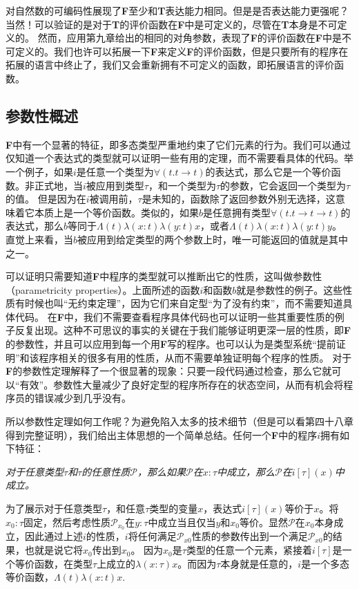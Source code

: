 对自然数的可编码性展现了\textbf{F}至少和\textbf{T}表达能力相同。但是是否表达能力更强呢？当然！可以验证的是对于\textbf{T}的评价函数在\textbf{F}中是可定义的，尽管在\textbf{T}本身是不可定义的。
然而，应用第九章给出的相同的对角参数，表现了\textbf{F}的评价函数在\textbf{F}中是不可定义的。我们也许可以拓展一下\textbf{F}来定义\textbf{F}的评价函数，但是只要所有的程序在拓展的语言中终止了，我们又会重新拥有不可定义的函数，即拓展语言的评价函数。

\subsection{参数性概述}
\textbf{F}中有一个显著的特征，即多态类型严重地约束了它们元素的行为。我们可以通过仅知道一个表达式的类型就可以证明一些有用的定理，而不需要看具体的代码。举一个例子，如果$i$是任意一个类型为$\forall (t.t\to t)$的表达式，那么它是一个等价函数。非正式地，当$i$被应用到类型$\tau$，和一个类型为$\tau$的参数，它会返回一个类型为$\tau$的值。
但是因为在$i$被调用前，$\tau$是未知的，函数除了返回参数外别无选择，这意味着它本质上是一个等价函数。类似的，如果$b$是任意拥有类型$\forall (t.t \to t \to t)$的表达式，那么$b$等同于$\Lambda (t) \lambda (x:t) \lambda (y:t) x$，或者$\Lambda (t) \lambda (x:t) \lambda (y:t) y$。
直觉上来看，当$b$被应用到给定类型的两个参数上时，唯一可能返回的值就是其中之一。

可以证明只需要知道\textbf{F}中程序的类型就可以推断出它的性质，这叫做参数性（parametricity properties）。上面所述的函数$i$和函数$b$就是参数性的例子。这些性质有时候也叫“无约束定理”，因为它们来自定型“为了没有约束”，而不需要知道具体代码。
在\textbf{F}中，我们不需要查看程序具体代码也可以证明一些其重要性质的例子反复出现。这种不可思议的事实的关键在于我们能够证明更深一层的性质，即\textbf{F}的参数性，并且可以应用到每一个用\textbf{F}写的程序。也可以认为是类型系统“提前证明”和该程序相关的很多有用的性质，从而不需要单独证明每个程序的性质。
对于\textbf{F}的参数性定理解释了一个很显著的现象：只要一段代码通过检查，那么它就可以“有效”。参数性大量减少了良好定型的程序所存在的状态空间，从而有机会将程序员的错误减少到几乎没有。

所以参数性定理如何工作呢？为避免陷入太多的技术细节（但是可以看第四十八章得到完整证明），我们给出主体思想的一个简单总结。任何一个\textbf{F}中的程序$i$拥有如下特征：
\begin{center}
  \textit{对于任意类型$\tau$和$\tau$的任意性质$\mathcal{P}$，那么如果$\mathcal{P}$在$x:\tau$中成立，那么$\mathcal{P}$在$i[\tau](x)$中成立。}
\end{center}

为了展示对于任意类型$\tau$，和任意$\tau$类型的变量$x$，表达式$i[\tau ](x)$等价于$x$。将$x_0: \tau$固定，然后考虑性质$\mathcal{P}_{x_0}$在$y:\tau$中成立当且仅当$y$和$x_0$等价。显然$\mathcal{P}$在$x_0$本身成立，因此通过上述$i$的性质，$i$将任何满足$\mathcal{P}_{x0}$性质的参数传出到一个满足$\mathcal{P}_{x0}$的结果，也就是说它将$x_0$传出到$x_0$。
因为$x_0$是$\tau$类型的任意一个元素，紧接着$i[\tau]$是一个等价函数，在类型$\tau$上成立的$\lambda(x:\tau)x$。而因为$\tau$本身就是任意的，$i$是一个多态等价函数，$\Lambda (t)\lambda (x:t) x.$

